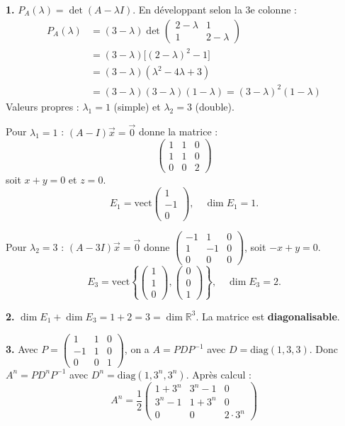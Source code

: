 \documentclass[12pt,a4paper]{article}
\begin{document}
\begin{boitecorrige}
\textbf{1.} $P_A(\lambda) = \det(A-\lambda I)$. En développant selon la 3e colonne :
\begin{align*}
P_A(\lambda) &= (3-\lambda)\det\begin{pmatrix}2-\lambda&1\\1&2-\lambda\end{pmatrix}\\
&= (3-\lambda)\bigl[(2-\lambda)^2-1\bigr]\\
&= (3-\lambda)(\lambda^2-4\lambda+3)\\
&= (3-\lambda)(3-\lambda)(1-\lambda) = (3-\lambda)^2(1-\lambda)
\end{align*}
Valeurs propres : $\lambda_1=1$ (simple) et $\lambda_2=3$ (double).

Pour $\lambda_1=1$ : $(A-I)\vec{x}=\vec{0}$ donne la matrice :
\[\begin{pmatrix}1&1&0\\1&1&0\\0&0&2\end{pmatrix}\]
soit $x+y=0$ et $z=0$.
\[
E_1 = \text{vect}\begin{pmatrix}1\\-1\\0\end{pmatrix}, \quad \dim E_1=1.
\]

Pour $\lambda_2=3$ : $(A-3I)\vec{x}=\vec{0}$ donne $\begin{pmatrix}-1&1&0\\1&-1&0\\0&0&0\end{pmatrix}$, soit $-x+y=0$.
\[
E_3 = \text{vect}\left\{\begin{pmatrix}1\\1\\0\end{pmatrix},\begin{pmatrix}0\\0\\1\end{pmatrix}\right\}, \quad \dim E_3=2.
\]

\textbf{2.} $\dim E_1+\dim E_3 = 1+2=3=\dim\mathbb{R}^3$. La matrice est \textbf{diagonalisable}.

\textbf{3.} Avec $P = \begin{pmatrix}1&1&0\\-1&1&0\\0&0&1\end{pmatrix}$, on a $A = PDP^{-1}$ avec $D=\text{diag}(1,3,3)$. Donc $A^n = PD^nP^{-1}$ avec $D^n=\text{diag}(1,3^n,3^n)$. Après calcul :
\[
A^n = \frac{1}{2}\begin{pmatrix}1+3^n&3^n-1&0\\3^n-1&1+3^n&0\\0&0&2\cdot3^n\end{pmatrix}
\]
\end{boitecorrige}
\end{document}
